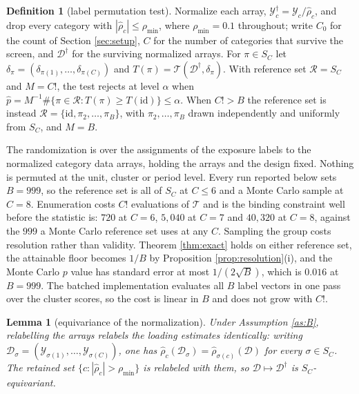 \documentclass[12pt]{article}
\newtheorem{lemma}{Lemma}
\theoremstyle{definition}
\newtheorem{definition}{Definition}
\numberwithin{equation}{section}
\begin{document}
\begin{definition}[label permutation test]
\label{def:perm}
Normalize each array, $\mathcal{Y}^{\dagger}_c = \mathcal{Y}_c/\hat{\rho}_c$,
and drop every category with $|\hat{\rho}_c| \le \rho_{\min}$, where
$\rho_{\min} = 0.1$ throughout; write $C_0$ for the count of Section
\ref{sec:setup}, $C$ for the number of categories that survive the screen, and
$\mathcal{D}^{\dagger}$ for the surviving normalized arrays. For
$\pi \in S_C$ let $\delta_\pi = (\delta_{\pi(1)},\dots,\delta_{\pi(C)})$ and
$T(\pi) = \mathcal{T}(\mathcal{D}^{\dagger},\delta_\pi)$. With reference set
$\mathcal{R} = S_C$ and $M = C!$, the test rejects at level $\alpha$ when
$\hat{p} = M^{-1}\#\{\pi \in \mathcal{R}: T(\pi) \ge T(\mathrm{id})\} \le
\alpha$. When $C! > B$ the reference set is instead $\mathcal{R} =
\{\mathrm{id},\pi_2,\dots,\pi_B\}$, with $\pi_2,\dots,\pi_B$ drawn
independently and uniformly from $S_C$, and $M = B$.
\end{definition}

The randomization is over the assignments of the exposure labels to the
normalized category data arrays, holding the arrays and the design fixed.
Nothing is permuted at the unit, cluster or period level. Every run reported
below sets $B = 999$, so the reference set is all of $S_C$ at $C \le 6$ and a
Monte Carlo sample at $C = 8$. Enumeration costs $C!$ evaluations of
$\mathcal{T}$ and is the binding constraint well before the statistic is: $720$
at $C = 6$, $5{,}040$ at $C = 7$ and $40{,}320$ at $C = 8$, against the $999$ a
Monte Carlo reference set uses at any $C$. Sampling the group costs resolution
rather than validity. Theorem \ref{thm:exact} holds on either reference set,
the attainable floor becomes $1/B$ by Proposition \ref{prop:resolution}(i), and
the Monte Carlo $p$ value has standard error at most $1/(2\sqrt{B})$, which is
$0.016$ at $B = 999$. The batched implementation evaluates all $B$ label vectors
in one pass over the cluster scores, so the cost is linear in $B$ and does not
grow with $C!$.

\begin{lemma}[equivariance of the normalization]
\label{lem:equi}
Under Assumption \ref{as:B}, relabelling the arrays relabels the loading
estimates identically: writing $\mathcal{D}_\sigma =
(\mathcal{Y}_{\sigma(1)},\dots,\mathcal{Y}_{\sigma(C)})$, one has
$\hat{\rho}_c(\mathcal{D}_\sigma) = \hat{\rho}_{\sigma(c)}(\mathcal{D})$ for
every $\sigma \in S_C$. The retained set $\{c: |\hat{\rho}_c| > \rho_{\min}\}$
is relabeled with them, so $\mathcal{D} \mapsto \mathcal{D}^{\dagger}$ is
$S_C$-equivariant.
\end{lemma}
\end{document}
